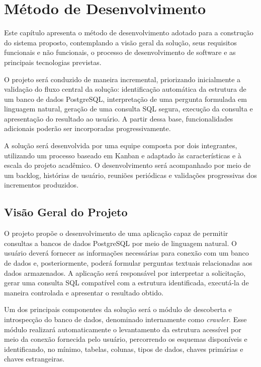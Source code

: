 \chapter{Método de Desenvolvimento}
\label{cap:02}

Este capítulo apresenta o método de desenvolvimento adotado para a construção do sistema proposto, contemplando a visão geral da solução, seus requisitos funcionais e não funcionais, o processo de desenvolvimento de software e as principais tecnologias previstas.

O projeto será conduzido de maneira incremental, priorizando inicialmente a validação do fluxo central da solução: identificação automática da estrutura de um banco de dados PostgreSQL, interpretação de uma pergunta formulada em linguagem natural, geração de uma consulta SQL segura, execução da consulta e apresentação do resultado ao usuário. A partir dessa base, funcionalidades adicionais poderão ser incorporadas progressivamente.

A solução será desenvolvida por uma equipe composta por dois integrantes, utilizando um processo baseado em Kanban e adaptado às características e à escala do projeto acadêmico. O desenvolvimento será acompanhado por meio de um backlog, histórias de usuário, reuniões periódicas e validações progressivas dos incrementos produzidos.


\section{Visão Geral do Projeto}
\label{sec:visao-geral}

O projeto propõe o desenvolvimento de uma aplicação capaz de permitir consultas a bancos de dados PostgreSQL por meio de linguagem natural. O usuário deverá fornecer as informações necessárias para conexão com um banco de dados e, posteriormente, poderá formular perguntas textuais relacionadas aos dados armazenados. A aplicação será responsável por interpretar a solicitação, gerar uma consulta SQL compatível com a estrutura identificada, executá-la de maneira controlada e apresentar o resultado obtido.

Um dos principais componentes da solução será o módulo de descoberta e introspecção do banco de dados, denominado internamente como \textit{crawler}. Esse módulo realizará automaticamente o levantamento da estrutura acessível por meio da conexão fornecida pelo usuário, percorrendo os esquemas disponíveis e identificando, no mínimo, tabelas, colunas, tipos de dados, chaves primárias e chaves estrangeiras.

